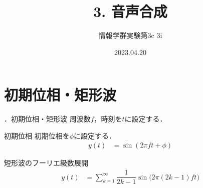 \documentclass[aspectratio=43]{beamer}
\title{3. 音声合成}
\subtitle{情報学群実験第3c 3i}
\author{Group 10\thanks{門屋 陽丈\and 谷保 愛華\and 内藤 熙人\and 成岡 小雪\and 平林 里菜\and 三上 柊\and 溝口 洸熙}}
\date{2023.04.20}
\newcommand{\showsec}{\thesection ．}
\begin{document}
\begin{frame}
    \titlepage
\end{frame}
\begin{frame}
    \begin{multicols}{2}
        \tableofcontents
    \end{multicols}
\end{frame}
\section{初期位相・矩形波}
\begin{frame}[t]{\showsec 初期位相・矩形波}
    周波数\(f\)，時刻を\(t\)に設定する．
    \begin{block}{初期位相}
        初期位相を\(\phi\)に設定する．
        \begin{align}
            y(t) & = \sin(2\pi ft+\phi)
        \end{align}
    \end{block}
    \begin{block}{短形波のフーリエ級数展開}
        \begin{align}
            y(t) & = \sum_{k=1}^{\infty}\dfrac{1}{2k-1}\sin\big(2\pi(2k-1)ft\big)
        \end{align}
    \end{block}
\end{frame}
\end{document}
